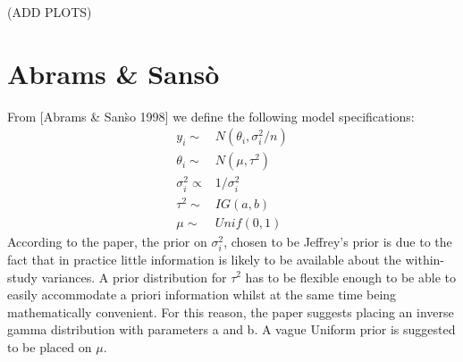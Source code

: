 \documentclass[a4paper, 9pt]{article}
\begin{document}
(ADD PLOTS)
\section{Abrams \& Sans\`o}
From [Abrams \& San\`so 1998] we define the following model specifications:
\begin{align*}
    y_i \sim& N(\theta_i, \sigma_i^2/n)\\
    \theta_i \sim& N(\mu, \tau^2)\\
    \sigma_i^2 \propto& 1/\sigma_i^2\\
    \tau^2 \sim& IG(a,b)\\
    \mu \sim& Unif(0,1)
\end{align*}
According to the paper, the prior on $\sigma_i^2$, chosen to be Jeffrey's prior is due to the fact that in practice little information is likely to be available about the within-study variances. A prior distribution for $\tau^2$ has to be flexible enough to be able to easily accommodate a priori
information whilst at the same time being mathematically convenient. For this reason, the paper suggests placing an inverse
gamma distribution with parameters a and b. A vague Uniform prior is suggested to be placed on $\mu$.
\end{document}
